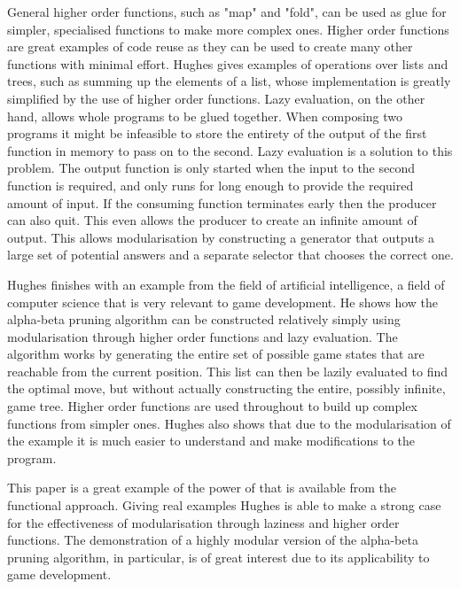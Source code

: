 General higher order functions, such as "map" and "fold", can be used as glue for
simpler, specialised functions to make more complex ones. Higher order functions
are great examples of code reuse as they can be used to create many other functions
with minimal effort. Hughes gives examples of operations over lists and trees, such
as summing up the elements of a list, whose implementation is greatly simplified
by the use of higher order functions. Lazy evaluation, on the other hand, allows
whole programs to be glued together. When composing two programs it might be
infeasible to store the entirety of the output of the first function in memory to
pass on to the second. Lazy evaluation is a solution to this problem. The output
function is only started when the input to the second function is required, and
only runs for long enough to provide the required amount of input. If the consuming
function terminates early then the producer can also quit. This even allows the
producer to create an infinite amount of output. This allows modularisation by
constructing a generator that outputs a large set of potential answers and a
separate selector that chooses the correct one.

Hughes finishes with an example from the field of artificial intelligence, a
field of computer science that is very relevant to game development. He shows
how the alpha-beta pruning algorithm can be constructed relatively simply using
modularisation through higher order functions and lazy evaluation. The algorithm
works by generating the entire set of possible game states that are reachable
from the current position. This list can then be lazily evaluated to find the
optimal move, but without actually constructing the entire, possibly infinite,
game tree. Higher order functions are used throughout to build up complex
functions from simpler ones. Hughes also shows that due to the modularisation
of the example it is much easier to understand and make modifications to the
program.

This paper is a great example of the power of that is available from the functional
approach. Giving real examples Hughes is able to make a strong case for the
effectiveness of modularisation through laziness and higher order functions.
The demonstration of a highly modular version of the alpha-beta pruning algorithm,
in particular, is of great interest due to its applicability to game development.
